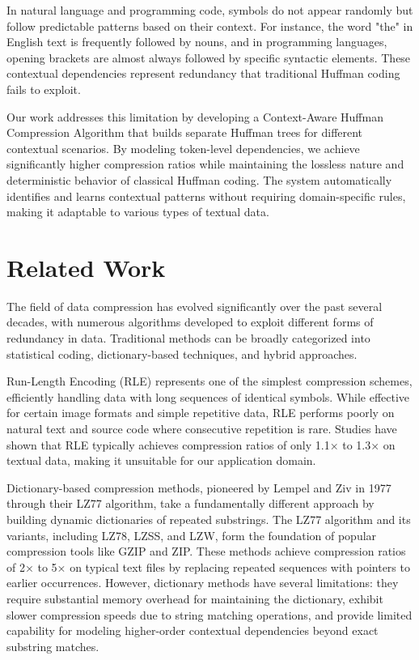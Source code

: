 \documentclass[conference]{IEEEtran}
\begin{document}
In natural language and programming code, symbols do not appear randomly but follow predictable patterns based on their context. For instance, the word "the" in English text is frequently followed by nouns, and in programming languages, opening brackets are almost always followed by specific syntactic elements. These contextual dependencies represent redundancy that traditional Huffman coding fails to exploit.

Our work addresses this limitation by developing a Context-Aware Huffman Compression Algorithm that builds separate Huffman trees for different contextual scenarios. By modeling token-level dependencies, we achieve significantly higher compression ratios while maintaining the lossless nature and deterministic behavior of classical Huffman coding. The system automatically identifies and learns contextual patterns without requiring domain-specific rules, making it adaptable to various types of textual data.

\section{Related Work}
The field of data compression has evolved significantly over the past several decades, with numerous algorithms developed to exploit different forms of redundancy in data. Traditional methods can be broadly categorized into statistical coding, dictionary-based techniques, and hybrid approaches.

Run-Length Encoding (RLE) represents one of the simplest compression schemes, efficiently handling data with long sequences of identical symbols. While effective for certain image formats and simple repetitive data, RLE performs poorly on natural text and source code where consecutive repetition is rare. Studies have shown that RLE typically achieves compression ratios of only 1.1× to 1.3× on textual data, making it unsuitable for our application domain.

Dictionary-based compression methods, pioneered by Lempel and Ziv in 1977 through their LZ77 algorithm, take a fundamentally different approach by building dynamic dictionaries of repeated substrings. The LZ77 algorithm and its variants, including LZ78, LZSS, and LZW, form the foundation of popular compression tools like GZIP and ZIP. These methods achieve compression ratios of 2× to 5× on typical text files by replacing repeated sequences with pointers to earlier occurrences. However, dictionary methods have several limitations: they require substantial memory overhead for maintaining the dictionary, exhibit slower compression speeds due to string matching operations, and provide limited capability for modeling higher-order contextual dependencies beyond exact substring matches.
\end{document}
